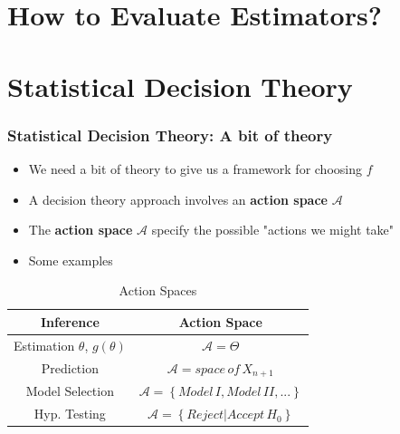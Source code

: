 \documentclass[
  shownotes,
  xcolor={svgnames},
  hyperref={colorlinks,citecolor=DarkBlue,linkcolor=DarkRed,urlcolor=DarkBlue}
  , aspectratio=169]{beamer}
\begin{document}
\section{How to Evaluate Estimators?}
\section{Statistical Decision Theory}
\begin{frame}
\frametitle{Statistical Decision Theory: A bit of theory}

\begin{itemize}
  \item We need a bit of theory to give us a framework for choosing $f$
  \item A decision theory approach involves an {\bf action space} $\mathcal{A}$
  \item The {\bf action space} $\mathcal{A}$ specify the possible "actions we might take"
  \item Some examples
\end{itemize}

\footnotesize

\begin{table}[H]
\caption{Action Spaces}

\begin{centering}
\begin{tabular}{cc}
\hline
Inference & Action Space\\
\hline
\hline
Estimation $\theta$, $g\left(\theta\right)$  & $\mathcal{A}=\Theta$\\
Prediction & $\mathcal{A}=space\,of\,X_{n+1}$\\
Model Selection & $\mathcal{A}=\left\{ Model\,I,Model\,II,...\right\} $\\
Hyp. Testing & $\mathcal{A}=\left\{ Reject|Accept\,H_{0}\right\} $\\

\hline
\end{tabular}
\par\end{centering}
\end{table}


\end{frame}

\end{document}
